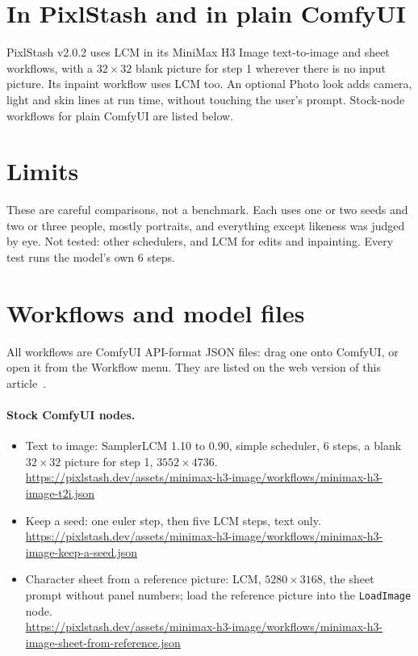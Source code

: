 \documentclass[11pt,a4paper]{article}
\begin{document}
\section{In PixlStash and in plain ComfyUI}

PixlStash v2.0.2 uses LCM in its MiniMax H3 Image text-to-image and sheet workflows, with a $32\times32$ blank picture for step 1 wherever there is no input picture. Its inpaint workflow uses LCM too. An optional Photo look adds camera, light and skin lines at run time, without touching the user's prompt. Stock-node workflows for plain ComfyUI are listed below.

\section{Limits}

These are careful comparisons, not a benchmark. Each uses one or two seeds and two or three people, mostly portraits, and everything except likeness was judged by eye. Not tested: other schedulers, and LCM for edits and inpainting. Every test runs the model's own 6 steps.

\section*{Workflows and model files}

All workflows are ComfyUI API-format JSON files: drag one onto ComfyUI, or open it from the Workflow menu. They are listed on the web version of this article~\cite{web}.

\paragraph{Stock ComfyUI nodes.}
\begin{itemize}
\item Text to image: SamplerLCM 1.10 to 0.90, simple scheduler, 6 steps, a blank $32\times32$ picture for step 1, $3552\times4736$.\\
\url{https://pixlstash.dev/assets/minimax-h3-image/workflows/minimax-h3-image-t2i.json}
\item Keep a seed: one euler step, then five LCM steps, text only.\\
\url{https://pixlstash.dev/assets/minimax-h3-image/workflows/minimax-h3-image-keep-a-seed.json}
\item Character sheet from a reference picture: LCM, $5280\times3168$, the sheet prompt without panel numbers; load the reference picture into the \texttt{LoadImage} node.\\
\url{https://pixlstash.dev/assets/minimax-h3-image/workflows/minimax-h3-image-sheet-from-reference.json}
\end{itemize}
\end{document}
